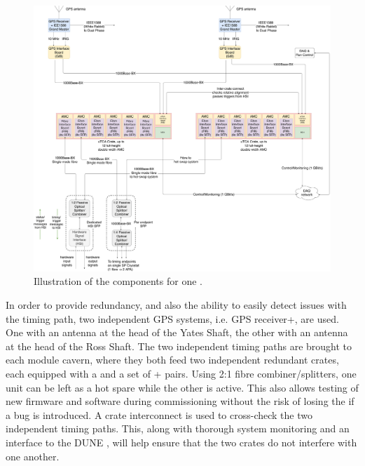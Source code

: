 \documentclass[main.tex]{subfiles}
\begin{document}
\begin{figure}[h]
\includegraphics[width=\textwidth]{DUNE_SP_Timing_DAQ_on_CryoM_GPS_In_CUC_01april20.pdf}
\caption{Illustration of the  components for one  .}
\label{fig:daq-readout-timing}
\end{figure}

In order to provide redundancy, and also the ability to easily detect issues with the timing path, two independent GPS systems, i.e. GPS receiver+, are used. One with an antenna at the head of the Yates Shaft, the other with an antenna at the head of the Ross Shaft. The two independent timing paths are brought to each module cavern, where they both feed two independent redundant  crates, each equipped with a  and a set of + pairs. Using 2:1 fibre combiner/splitters, one  unit can be left as a hot spare while the other is active. This also allows testing of new firmware and software during commissioning without the risk of losing the  if a bug is introduced. A  crate interconnect is used to cross-check the two independent timing paths. This, along with thorough system monitoring and an interface to the DUNE , will help ensure that the two  crates do not interfere with one another.
\end{document}
